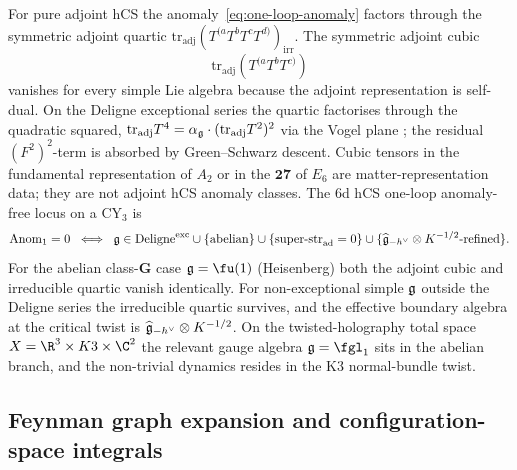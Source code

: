 \begin{remark}
\label{rem:hcs-anomaly-locus}
For pure adjoint hCS the anomaly~\eqref{eq:one-loop-anomaly} factors
through the symmetric adjoint quartic
$\mathrm{tr}_{\mathrm{adj}}(T^{(a}T^{b}T^{c}T^{d)})_{\mathrm{irr}}$.
The symmetric adjoint cubic
\[
\mathrm{tr}_{\mathrm{adj}}(T^{(a}T^{b}T^{c)})
\]
vanishes for every simple Lie algebra because the adjoint
representation is self-dual. On the
Deligne exceptional series the quartic factorises through the
quadratic squared,
$\mathrm{tr}_{\mathrm{adj}}T^{4} = \alpha_{\mathfrak{g}}\cdot
(\mathrm{tr}_{\mathrm{adj}}T^{2})^{2}$ via the Vogel plane
\cite{Deligne1996,Costello2017M5,CL16}; the residual
$(F^{2})^{2}$-term is absorbed by Green--Schwarz descent. Cubic
tensors in the fundamental representation of \(A_2\) or in the
\(\mathbf{27}\) of \(E_6\) are matter-representation data; they are
not adjoint hCS anomaly classes. The 6d hCS one-loop anomaly-free
locus on a CY$_{3}$ is
\begin{equation}\label{eq:hcs-anom-locus}
\mathrm{Anom}_{1}=0\;\iff\;
\mathfrak{g}\in\mathrm{Deligne}^{\mathrm{exc}}
\cup\{\mathrm{abelian}\}
\cup\{\mathrm{super\text{-}str}_{\mathrm{ad}}=0\}
\cup\{\widehat{\mathfrak{g}}_{-h^{\vee}}\otimes K^{-1/2}\text{-refined}\}.
\end{equation}
For the
abelian class-$\mathbf G$ case $\fg=\fu(1)$ (Heisenberg) both
the adjoint cubic and irreducible quartic vanish identically. For non-exceptional simple $\mathfrak{g}$
outside the Deligne series the irreducible quartic survives, and
the effective boundary algebra at the critical twist is
$\widehat{\mathfrak{g}}_{-h^{\vee}}\otimes K^{-1/2}$. On the twisted-holography
total space $X = \R^{3}\times K3\times\C^{2}$ the relevant
gauge algebra $\fg = \fgl_{1}$ sits in the abelian branch, and the
non-trivial dynamics resides in the K3 normal-bundle twist.
\end{remark}

\subsection{Feynman graph expansion and configuration-space integrals}
\label{subsec:hcs-feynman}


